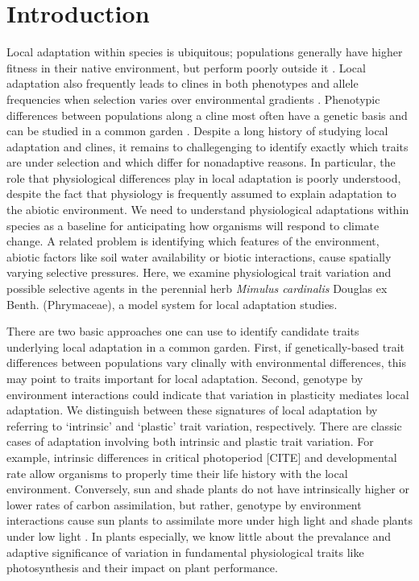 \documentclass[11pt, oneside]{article}
\newcommand{\stretchy}{1.5}
\begin{document}
\setstretch{\stretchy}

\section*{Introduction}


Local adaptation within species is ubiquitous; populations generally have higher fitness in their native environment, but perform poorly outside it \citep{Schluter_2000, Hereford_2009}. Local adaptation also frequently leads to clines in both phenotypes and allele frequencies when selection varies over environmental gradients \citep{Huxley_1938, Endler_1977}. Phenotypic differences between populations along a cline most often have a genetic basis and can be studied in a common garden \citep{Turesson_1922, Clausen_etal_1940, Hiesey_etal_1942}. Despite a long history of studying local adaptation and clines, it remains to challegenging to identify exactly which traits are under selection and which differ for nonadaptive reasons. In particular, the role that physiological differences play in local adaptation is poorly understood, despite the fact that physiology is frequently assumed to explain adaptation to the abiotic environment. We need to understand physiological adaptations within species as a baseline for anticipating how organisms will respond to climate change. A related problem is identifying which features of the environment, abiotic factors like soil water availability or biotic interactions, cause spatially varying selective pressures. Here, we examine physiological trait variation and possible selective agents in the perennial herb \textit{Mimulus cardinalis} Douglas ex Benth. (Phrymaceae), a model system for local adaptation studies.

There are two basic approaches one can use to identify candidate traits underlying local adaptation in a common garden. First, if genetically-based trait differences between populations vary clinally with environmental differences, this may point to traits important for local adaptation. Second, genotype by environment interactions could indicate that variation in plasticity mediates local adaptation. We distinguish between these signatures of local adaptation by referring to `intrinsic' and `plastic' trait variation, respectively. There are classic cases of adaptation involving both intrinsic and plastic trait variation. For example, intrinsic differences in critical photoperiod [CITE] and developmental rate \citep{Stinchcombe_etal_2004} allow organisms to properly time their life history with the local environment. Conversely, sun and shade plants do not have intrinsically higher or lower rates of carbon assimilation, but rather, genotype by environment interactions cause sun plants to assimilate more under high light and shade plants under low light \citep{Givnish_1988}. In plants especially, we know little about the prevalance and adaptive significance of variation in fundamental physiological traits like photosynthesis and their impact on plant performance.
\end{document}
